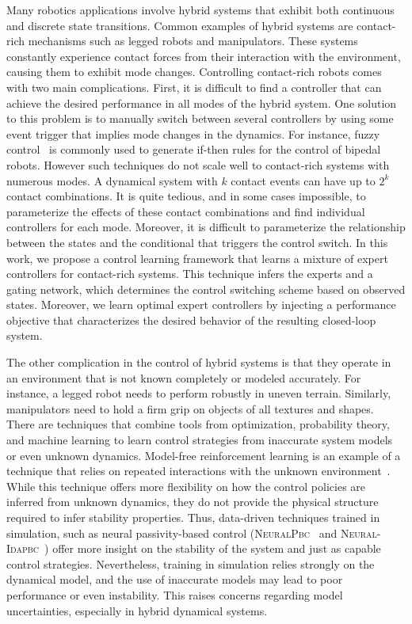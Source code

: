 

Many robotics applications involve hybrid systems that exhibit both continuous and 
discrete state transitions. Common examples of hybrid systems are contact-rich mechanisms such as legged robots and manipulators.
These systems constantly experience contact forces from their interaction with the environment, causing them to exhibit mode changes.
Controlling contact-rich robots comes with two main complications.
First, it is difficult to find a controller that can achieve the desired performance in all modes of the hybrid system.
%
One solution to this problem is to manually switch between several controllers by using some
event trigger that implies mode changes in the dynamics.
%
For instance, fuzzy control~\cite{kahraman2020fuzzy, katic2003survey} is commonly used to generate if-then rules for the control of bipedal robots.
However such techniques do not scale well to contact-rich systems with numerous modes.
A dynamical system with $k$ contact events can have up
to $2^k$ contact combinations. It is quite tedious, and in some cases impossible, to parameterize the effects
of these contact combinations and find individual controllers for each mode.
Moreover, it is difficult to parameterize the relationship between the states and
the conditional that triggers the control switch. 
%
In this work, we propose a control learning framework that learns a mixture of expert controllers for contact-rich systems.
%
This technique infers the experts and a gating network, which determines the control switching scheme based on observed states.
%
Moreover, we learn optimal expert controllers by injecting a performance objective that characterizes the desired behavior of the resulting closed-loop system.


The other complication in the control of hybrid systems is that they operate in an environment that is not known completely or modeled accurately.
%
For instance, a legged robot needs to perform robustly in uneven terrain. Similarly, manipulators need to hold a firm grip on objects of all textures and shapes.
%
There are techniques that combine tools from optimization, probability theory,
and machine learning to learn control strategies from inaccurate system models
or even unknown dynamics.
%
Model-free reinforcement learning is an example of a technique that relies on
repeated interactions with the unknown
environment~\cite{heess2017emergence,andrychowicz2020learning,lillicrap2015continuous}.
%
While this technique offers more flexibility on how the control policies are
inferred from unknown dynamics, they do not provide the physical structure
required to infer stability properties.
%
Thus, data-driven techniques trained in simulation, such as neural
passivity-based control (\textsc{NeuralPbc}~\cite{neuralpbc} and
\textsc{Neural-Idapbc}~\cite{neuralidapbc}) offer more insight on the stability
of the system and just as capable control strategies.
%
Nevertheless, training in simulation relies strongly on the
dynamical model, and the use of inaccurate models may lead to poor performance
or even instability.
%
This raises concerns regarding model uncertainties, especially in hybrid dynamical
systems.
%

